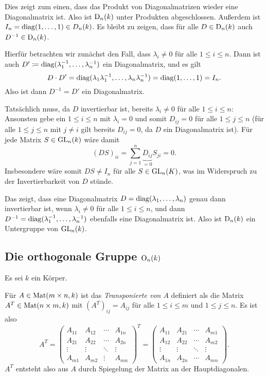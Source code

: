 Dies zeigt zum einen, dass das Produkt von Diagonalmatrizen wieder eine Diagonalmatrix ist. Also ist $\mathrm{D}_n(k)$ unter Produkten abgeschlossen. Außerdem ist $I_n = \mathrm{diag}(1, \dotsc, 1) \in D_n(k)$. Es bleibt zu zeigen, dass für alle $D \in \mathrm{D}_n(k)$ auch $D^{-1} \in \mathrm{D}_n(k)$.

Hierfür betrachten wir zunächst den Fall, dass $\lambda_i \neq 0$ für alle $1 \leq i \leq n$. Dann ist auch $D' \coloneqq \mathrm{diag}(\lambda_1^{-1}, \dotsc, \lambda_n^{-1})$ ein Diagonalmatrix, und es gilt
\[
 D \cdot D'
 = \mathrm{diag}(\lambda_1 \lambda_1^{-1}, \dotsc, \lambda_n \lambda_n^{-1})
 = \mathrm{diag}(1, \dotsc, 1)
 = I_n.
\]
Also ist dann $D^{-1} = D'$ ein Diagonalmatrix.

Tatsächlich muss, da $D$ invertierbar ist, bereits $\lambda_i \neq 0$ für alle $1 \leq i \leq n$: Ansonsten gebe ein $1 \leq i \leq n$ mit $\lambda_i = 0$ und somit $D_{ij} = 0$ für alle $1 \leq j \leq n$ (für alle $1 \leq j \leq n$ mit $j \neq i$ gilt bereits $D_{ij} = 0$, da $D$ ein Diagonalmatrix ist). Für jede Matrix $S \in \mathrm{GL}_n(k)$ wäre damit
\[
 (DS)_{ii}
 = \sum_{j=1}^n \underbrace{D_{ij}}_{=0} S_{ji}
 = 0.
\]
Insbesondere wäre somit $DS \neq I_n$ für alle $S \in \mathrm{GL}_n(K)$, was im Widerspruch zu der Invertierbarkeit von $D$ stünde.

Das zeigt, dass eine Diagonalmatrix $D = \mathrm{diag}(\lambda_1, \dotsc, \lambda_n)$ genau dann invertierbar ist, wenn $\lambda_i \neq 0$ für alle $1 \leq i \leq n$, und dann $D^{-1} = \mathrm{diag}(\lambda_1^{-1}, \dotsc, \lambda_n^{-1})$ ebenfalls eine Diagonalmatrix ist. Also ist $\mathrm{D}_n(k)$ ein Untergruppe von $\mathrm{GL}_n(k)$.





\subsection{Die orthogonale Gruppe \texorpdfstring{$\mathrm{O}_n(k)$}{On(k)}}
Es sei $k$ ein Körper.

\begin{defi}
 Für $A \in \mathrm{Mat}(m \times n, k)$ ist das \emph{Transponierte von $A$} definiert als die Matrix $A^T \in \mathrm{Mat}(n \times m, k)$ mit $(A^T)_{ij} = A_{ij}$ für alle $1 \leq i \leq m$ und $1 \leq j \leq n$. Es ist also
 \[
  A^T
  =
  \begin{pmatrix}
   A_{11} & A_{12} & \cdots & A_{1n} \\
   A_{21} & A_{22} & \cdots & A_{2n} \\
   \vdots & \vdots & \ddots & \vdots \\
   A_{m1} & A_{m2} & \vdots & A_{mn}
  \end{pmatrix}^T
  =
  \begin{pmatrix}
   A_{11} & A_{21} & \cdots & A_{m1} \\
   A_{12} & A_{22} & \cdots & A_{m2} \\
   \vdots & \vdots & \ddots & \vdots \\
   A_{1n} & A_{2n} & \cdots & A_{mn}
  \end{pmatrix}.
 \]
 $A^T$ entsteht also aus $A$ durch Spiegelung der Matrix an der Hauptdiagonalen.
\end{defi}

